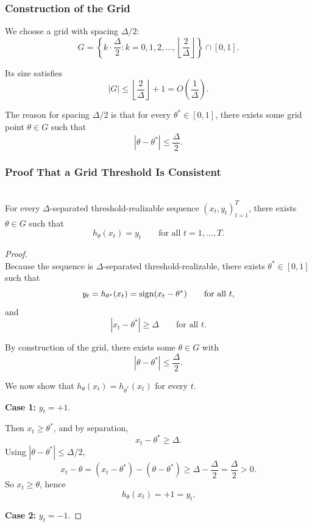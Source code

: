 \documentclass{article}
\begin{document}
\begin{solutionbox}

\subsubsection{Construction of the Grid}

We choose a grid with spacing $\Delta/2$:
\[
G
=
\left\{
k\cdot \frac{\Delta}{2}
:
k=0,1,2,\dots,\left\lfloor \frac{2}{\Delta}\right\rfloor
\right\}
\cap [0,1].
\]

Its size satisfies
\[
|G|
\le
\left\lfloor \frac{2}{\Delta}\right\rfloor + 1
=
O\!\left(\frac{1}{\Delta}\right).
\]

The reason for spacing $\Delta/2$ is that for every $\theta^* \in [0,1]$,
there exists some grid point $\theta \in G$ such that
\[
|\theta-\theta^*| \le \frac{\Delta}{2}.
\]

\subsubsection{Proof That a Grid Threshold Is Consistent}

\begin{claim}
\leavevmode\\
    For every $\Delta$-separated threshold-realizable sequence
    $(x_t,y_t)_{t=1}^T$, there exists $\theta \in G$ such that
    \[
    h_\theta(x_t)=y_t
    \qquad \text{for all } t=1,\dots,T.
    \]
\end{claim}
\begin{proof}
\leavevmode\\
Because the sequence is $\Delta$-separated threshold-realizable, there exists
$\theta^* \in [0,1]$ such that
\[
y_t = h_{\theta^*}(x_t)=\operatorname{sign}(x_t-\theta^*)
\qquad \text{for all } t,
\]
and
\[
|x_t-\theta^*| \ge \Delta
\qquad \text{for all } t.
\]

By construction of the grid, there exists some $\theta \in G$ with
\[
|\theta-\theta^*| \le \frac{\Delta}{2}.
\]

We now show that $h_\theta(x_t)=h_{\theta^*}(x_t)$ for every $t$.

\textbf{Case 1:} $y_t=+1$.

Then $x_t \ge \theta^*$, and by separation,
\[
x_t-\theta^* \ge \Delta.
\]
Using $|\theta-\theta^*| \le \Delta/2$,
\[
x_t-\theta
=
(x_t-\theta^*)-(\theta-\theta^*)
\ge
\Delta-\frac{\Delta}{2}
=
\frac{\Delta}{2}
>0.
\]
So $x_t \ge \theta$, hence
\[
h_\theta(x_t)=+1=y_t.
\]

\textbf{Case 2:} $y_t=-1$.


\end{proof}
\end{solutionbox}
\end{document}
